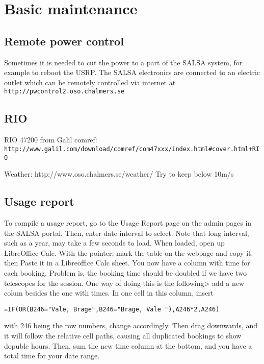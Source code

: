 \chapter{Basic maintenance}

\section{Remote power control}
Sometimes it is needed to cut the power to a part of the SALSA system,
for example to reboot the USRP. The SALSA electronics are connected to an electric outlet which
can be remotely controlled via internet at 
\verb! http://pwcontrol2.oso.chalmers.se!

\section{RIO}
RIO 47200 from Galil
comref: \verb! http://www.galil.com/download/comref/com47xxx/index.html#cover.html+RIO!

Weather:
http://www.oso.chalmers.se/weather/
Try to keep below 10m/s

\section{Usage report}
To compile a usage report, go to the Usage Report page on the admin pages in the
SALSA portal. Then, enter date interval to select. Note that long interval, such as a year,
may take a few seconds to load. When loaded, open up LibreOffice Calc. 
With the pointer, mark the table on the webpage and copy it. then
Paste it in a Libreoffice Calc sheet. 
You now have a column with time for each booking. Problem is, the booking
time should be doubled if we have two telescopes for the session. One 
way of doing this is the following> add a new colum besides the one with times.
In one cell in this column, insert
\begin{verbatim}
=IF(OR(B246="Vale, Brage",B246="Brage, Vale "),A246*2,A246)
\end{verbatim}
with 246 being the row numbers, change accordingly.
Then drag downwards, and it will follow the relative cell paths,
causing all duplicated bookings to show dopuble hours. Then, sum
the new time column at the bottom, and you have a total time
for your date range.
